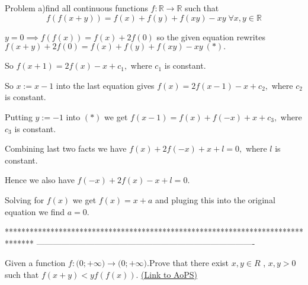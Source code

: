 \begin{solution}
	\begin{tcolorbox}Problem 
a)find all continuous functions $f:\mathbb{R}\to\mathbb{R}$ such that
\[f(f(x+y))=f(x)+f(y)+f(xy)-xy\;\forall x,y\in\mathbb{R}\]\end{tcolorbox}

$y=0\implies f(f(x))=f(x)+2f(0)$ so the given equation rewrites $f(x+y)+2f(0)=f(x)+f(y)+f(xy)-xy \ (*).$

So $f(x+1)=2f(x)-x+c_1,$ where $c_1$ is constant. 

So $x:=x-1$ into  the last equation gives $f(x)=2f(x-1)-x+c_2, $ where $c_2$ is constant. 

Putting $y:=-1$ into $(*)$ we get $f(x-1)=f(x)+f(-x)+x+c_3,$ where $c_3$ is constant. 

Combining last two facts we have $f(x)+2f(-x)+x+l=0, $ where $l$ is constant.  

Hence we also have $f(-x)+2f(x)-x+l=0.$

Solving for $f(x)$ we get $f(x)=x+a$ and pluging this into the original equation we find $a=0.$
\end{solution}
*******************************************************************************
-------------------------------------------------------------------------------

\begin{problem}
	Given a function ${{f: \mathbb(0;+\infty)}\to\mathbb(0;+\infty)}$.Prove that there exist $x,y{\in}R$ , $x,y>0$ such that $f(x+y)<yf(f(x))$.
	\flushright \href{https://artofproblemsolving.com/community/c6h558931}{(Link to AoPS)}
\end{problem}



